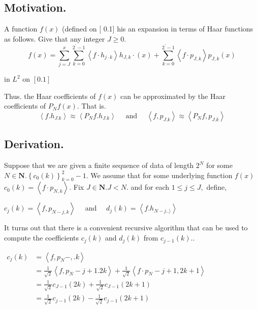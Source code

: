 \subsection*{Motivation.}
\par

A function $f(x)$ (defined on [ 0.1] his an expansion in terms of
Haar functions as follows. Give that any integer $J \geq 0$.
$$
f(x)=\sum_{j=J}^{x} \sum_{k=0}^{2^{\prime}-1}\left\langle f \cdot h_{j \cdot k}\right\rangle h_{J, k} \cdot(x)+\sum_{k=0}^{2^{\prime}-1}\left\langle f \cdot p_{J, k}\right\rangle p_{J, k}(x)
$$

in $L^{2}$ on $[0.1]$

Thus. the Haar coefficients of $f(x)$ can be approximated by the Haar coefficients of $P_{N} f(x)$. That is.
$$
\left\langle f . h_{J . k}\right\rangle \approx\left\langle P_{N} f . h_{J . k}\right\rangle \quad \text { and } \quad\left\langle f, p_{J . k}\right\rangle \approx\left\langle P_{N} f, p_{J . k}\right\rangle
$$

\subsection*{Derivation.}
\par

Suppose that we are given a finite sequence of data of length $2^{N}$ for some
$N \in \mathbf{N} .\left\{c_{0}(k)\right\}_{k=0}^{2}-1$. We assume that for some underlying function $f(x)$
$c_{0}(k)=\left\langle f \cdot p_{N, k}\right\rangle .$ Fix $J \in \mathbf{N} . J<N .$ and for each $1 \leq j \leq J,$ define,

$c_{j}(k)=\left\langle f, p_{N-j, k}\right\rangle \quad$ and $\quad d_{j}(k)=\left\langle f . h_{N-j . .\rangle}\right\rangle$

\par
It turns out that there is a convenient recursive algorithm that can be used to compute the coefficients $c_{j}(k)$ and $d_{j}(k)$ from $c_{j-1}(k) .$.

$\begin{aligned} c_{j}(k) &=\left\langle f, p_{N}-, . k\right\rangle \\ &=\frac{1}{\sqrt{2}}\left\langle f, p_{N}-j+1.2 k\right\rangle+\frac{1}{\sqrt{2}}\left\langle f \cdot p_{N}-j+1,2 k+1\right\rangle \\ &=\frac{1}{\sqrt{2}} c_{J-1}(2 k)+\frac{1}{\sqrt{2}} c_{J-1}(2 k+1) \\ &=\frac{1}{\sqrt{2}} c_{j-1}(2 k)-\frac{1}{\sqrt{2}} c_{j-1}(2 k+1) \end{aligned}$

